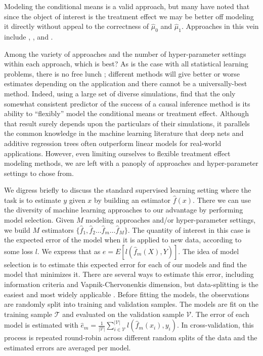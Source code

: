 Modeling the conditional means is a valid approach, but many have noted that since the object of interest is the treatment effect we may be better off modeling it directly without appeal to the correctness of $\hat\mu_0$ and $\hat\mu_1$. Approaches in this vein include \citet{Zhao:2017vi}, \citet{Athey:2016wm}, and \citet{Powers:2017wd}. 

Among the variety of approaches and the number of hyper-parameter settings within each approach, which is best? As is the case with all statistical learning problems, there is no free lunch \cite{Wolpert:1996fp}; different methods will give better or worse estimates depending on the application and there cannot be a universally-best method. Indeed, using a large set of diverse simulations, \citet{Dorie:2017uo} find that the only somewhat consistent predictor of the success of a causal inference method is its ability to ``flexibly'' model the conditional means or treatment effect. Although that result surely depends upon the particulars of their simulations, it parallels the common knowledge in the machine learning literature that deep nets and additive regression trees often outperform linear models for real-world applications. However, even limiting ourselves to flexible treatment effect modeling methods, we are left with a panoply of approaches and hyper-parameter settings to chose from. 

We digress briefly to discuss the standard supervised learning setting where the task is to estimate $y$ given $x$ by building an estimator $\hat{f}(x)$. There we can use the diversity of machine learning approaches to our advantage by performing model selection. Given $M$ modeling approaches and/or hyper-parameter settings, we build $M$ estimators $\{\hat f_1, \hat f_2 \dots \hat f_m \dots \hat f_M\}$. The quantity of interest in this case is the expected error of the model when it is applied to new data, according to some loss $l$. We express that as $e = E[l(\hat f_m(X), Y)]$. The idea of model selection is to estimate this expected error for each of our models and find the model that minimizes it. There are several ways to estimate this error, including information criteria and Vapnik-Chervonenkis dimension, but data-splitting is the easiest and most widely applicable \cite{esl:2009wc}. Before fitting the models, the observations are randomly split into training and validation samples. The models are fit on the training sample $\mathcal{T}$ and evaluated on the validation sample $\mathcal{V}$. The error of each model is estimated with $\hat e_m = \frac{1}{|\mathcal{V}|}\sum_{i \in \mathcal{V}}^{|\mathcal{V}|} l(\hat f_m (x_i), y_i)$. In cross-validation, this process is repeated round-robin across different random splits of the data and the estimated errors are averaged per model.

